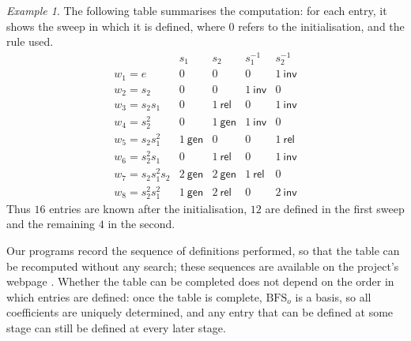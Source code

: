 \documentclass[11pt, reqno]{amsart}
\newcommand{\BFS}{\mathrm{BFS}}
\numberwithin{equation}{section}
\theoremstyle{remark}
\newtheorem{example}[theorem]{Example}
\begin{document}
\begin{example}
{				The following table summarises the computation: for each entry, it
				shows the sweep in which it is defined, where $0$ refers to the
				initialisation, and the rule used.
				\[
				\begin{array}{l|cccc}
					& s_1 & s_2 & s_1^{-1} & s_2^{-1}\\\hline
					w_1=e & 0 & 0 & 0 & 1\ \textsf{inv}\\
					w_2=s_2 & 0 & 0 & 1\ \textsf{inv} & 0\\
					w_3=s_2s_1 & 0 & 1\ \textsf{rel} & 0 & 1\ \textsf{inv}\\
					w_4=s_2^2 & 0 & 1\ \textsf{gen} & 1\ \textsf{inv} & 0\\
					w_5=s_2s_1^2 & 1\ \textsf{gen} & 0 & 0 & 1\ \textsf{rel}\\
					w_6=s_2^2s_1 & 0 & 1\ \textsf{rel} & 0 & 1\ \textsf{inv}\\
					w_7=s_2s_1^2s_2 & 2\ \textsf{gen} & 2\ \textsf{gen} & 1\ \textsf{rel} & 0\\
					w_8=s_2^2s_1^2 & 1\ \textsf{gen} & 2\ \textsf{rel} & 0 & 2\ \textsf{inv}
				\end{array}
				\]
				Thus $16$ entries are known after the initialisation, $12$ are defined
				in the first sweep and the remaining $4$ in the second.}
		\end{example} 
		
		
		Our programs record the sequence of definitions performed, so that the table can be recomputed without any search; these sequences are available on the project's webpage \cite{web}. Whether the table can be completed does not depend on the order in which entries are defined: once the table is complete, $\BFS_o$ is a basis, so all coefficients are uniquely determined, and any entry that can be defined at some stage can still be defined at every later stage. 
		
		
		
		
		
\end{document}
